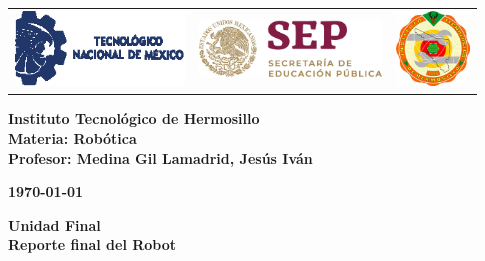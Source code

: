 \begin{titlepage}
	\centering
	\begin{tabular}{@{}p{} p{} p{}@{}}
		\includegraphics[height=2cm]{tecnm} & 
		\centering \includegraphics[height=1.5cm]{SEP} & 
		\raggedleft \includegraphics[height=2cm]{ith.jpg} \\
	\end{tabular}
	
	\vspace{2em}
	
	\noindent
	\begin{minipage}[t]{0.6\textwidth}
		\raggedright
		\small \textbf{%
			Instituto Tecnológico de Hermosillo\\
			Materia: Robótica\\
			Profesor: Medina Gil Lamadrid, Jesús Iván%
		}
	\end{minipage}%
	\hfill
	\begin{minipage}[t]{0.3\textwidth}
		\raggedleft
		\small \textbf{\today}
	\end{minipage}
	
	\vspace{2em}
	
	{\large \textbf{Unidad Final}}\\
	\vspace{1em}
	{\Huge \textbf{Reporte final del Robot}}
	
	\vspace{1em}
	

\end{titlepage}
